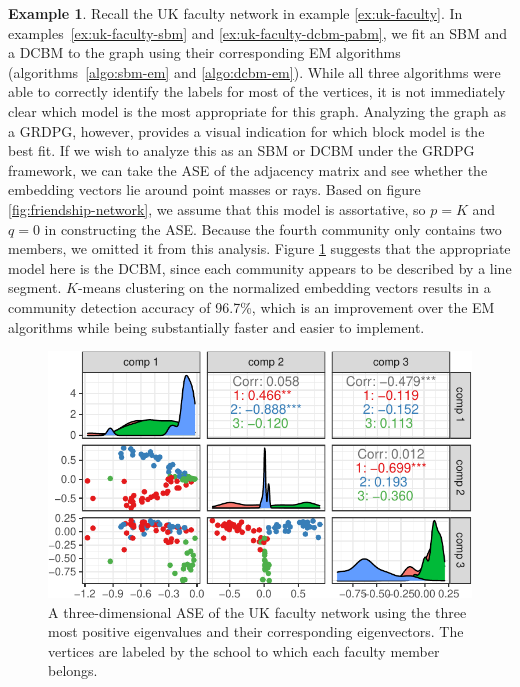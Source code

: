 \documentclass[
  12pt,
]{article}
\theoremstyle{definition}
\theoremstyle{definition}
\newtheorem{example}{Example}[section]
\theoremstyle{definition}
\theoremstyle{definition}
\theoremstyle{remark}
\begin{document}
\begin{example}
Recall the UK faculty network in example \ref{ex:uk-faculty}. 
In examples~\ref{ex:uk-faculty-sbm} and \ref{ex:uk-faculty-dcbm-pabm}, we fit an SBM and a DCBM to the graph using their corresponding EM algorithms (algorithms~\ref{algo:sbm-em} and \ref{algo:dcbm-em}). 
While all three algorithms were able to correctly identify the labels for most of the vertices, it is not immediately clear which model is the most appropriate for this graph. 
Analyzing the graph as a GRDPG, however, provides a visual indication for which block model is the best fit. 
If we wish to analyze this as an SBM or DCBM under the GRDPG framework, we can take the ASE of the adjacency matrix and see whether the embedding vectors lie around point masses or rays. 
Based on figure \ref{fig:friendship-network}, we assume that this model is assortative, so $p = K$ and $q = 0$ in constructing the ASE. 
Because the fourth community only contains two members, we omitted it from this analysis. 
Figure \ref{fig:ukfaculty-ase} suggests that the appropriate model here is the DCBM, since each community appears to be described by a line segment. 
$K$-means clustering on the normalized embedding vectors results in a community detection accuracy of 96.7\%, which is an improvement over the EM algorithms while being substantially faster and easier to implement. 

\begin{figure}[H]

{\centering \includegraphics{draft_files/figure-latex/ukfaculty-ase-1} 

}

\caption{A three-dimensional ASE of the UK faculty network using the three most positive eigenvalues and their corresponding eigenvectors. The vertices are labeled by the school to which each faculty member belongs.}\label{fig:ukfaculty-ase}
\end{figure}

\end{example}
\end{document}

